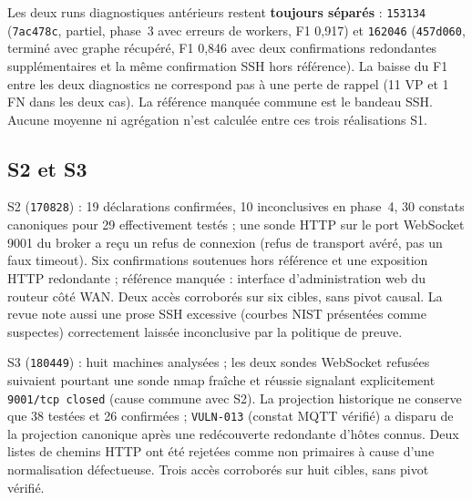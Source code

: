 \documentclass[11pt,a4paper]{article}
\newcommand{\code}[1]{{\urlstyle{tt}\nolinkurl{#1}}}
\begin{document}
Les deux runs diagnostiques ant\'erieurs restent \textbf{toujours s\'epar\'es} : \code{153134} (\code{7ac478c}, partiel, phase~3 avec erreurs de workers, F1 0,917) et \code{162046} (\code{457d060}, termin\'e avec graphe r\'ecup\'er\'e, F1 0,846 avec deux confirmations redondantes suppl\'ementaires et la m\^eme confirmation SSH hors r\'ef\'erence). La baisse du F1 entre les deux diagnostics ne correspond pas \`a une perte de rappel (11 VP et 1 FN dans les deux cas). La r\'ef\'erence manqu\'ee commune est le bandeau SSH. Aucune moyenne ni agr\'egation n'est calcul\'ee entre ces trois r\'ealisations S1.

\subsection{S2 et S3}
S2 (\code{170828}) : 19 d\'eclarations confirm\'ees, 10 inconclusives en phase~4, 30 constats canoniques pour 29 effectivement test\'es ; une sonde HTTP sur le port WebSocket 9001 du broker a re\c{c}u un refus de connexion (refus de transport av\'er\'e, pas un faux timeout). Six confirmations soutenues hors r\'ef\'erence et une exposition HTTP redondante ; r\'ef\'erence manqu\'ee : interface d'administration web du routeur c\^ot\'e WAN. Deux acc\`es corrobor\'es sur six cibles, sans pivot causal. La revue note aussi une prose SSH excessive (courbes NIST pr\'esent\'ees comme suspectes) correctement laiss\'ee inconclusive par la politique de preuve.

S3 (\code{180449}) : huit machines analys\'ees ; les deux sondes WebSocket refus\'ees suivaient pourtant une sonde nmap fra\^iche et r\'eussie signalant explicitement \code{9001/tcp closed} (cause commune avec S2). La projection historique ne conserve que 38 test\'ees et 26 confirm\'ees ; \code{VULN-013} (constat MQTT v\'erifi\'e) a disparu de la projection canonique apr\`es une red\'ecouverte redondante d'h\^otes connus. Deux listes de chemins HTTP ont \'et\'e rejet\'ees comme non primaires \`a cause d'une normalisation d\'efectueuse. Trois acc\`es corrobor\'es sur huit cibles, sans pivot v\'erifi\'e.
\end{document}
